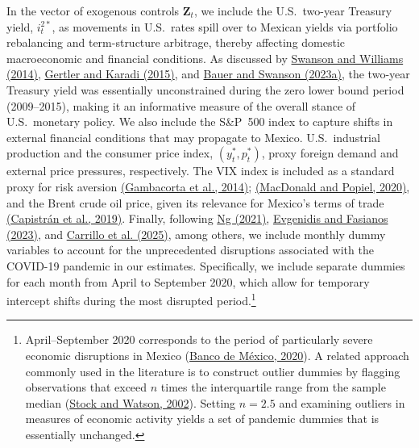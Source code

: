 \documentclass[\latexroot/\projectname]{subfiles}
\begin{document}
In the vector of exogenous controls $\boldsymbol{Z}_t$, we include the U.S.\ two-year Treasury yield, $i_t^{2*}$, as movements in U.S.\ rates spill over to Mexican yields via portfolio rebalancing and term-structure arbitrage, thereby affecting domestic macroeconomic and financial conditions. As discussed by \hyperlink{Swanson and Williams (2014)}{Swanson and Williams (2014)}, \hyperlink{Gertler and Karadi (2015)}{Gertler and Karadi (2015)}, and \hyperlink{Bauer and Swanson (2023a)}{Bauer and Swanson (2023a)}, the two-year Treasury yield was essentially unconstrained during the zero lower bound period (2009--2015), making it an informative measure of the overall stance of U.S.\ monetary policy. We also include the S\&P~500 index to capture shifts in external financial conditions that may propagate to Mexico. U.S.\ industrial production and the consumer price index, $(y_t^*, p_t^*)$, proxy foreign demand and external price pressures, respectively. The VIX index is included as a standard proxy for risk aversion \hyperlink{Gambacorta et al. (2014)}{(Gambacorta et al., 2014)}; \hyperlink{MacDonald and Popiel (2020)}{(MacDonald and Popiel, 2020)}, and the Brent crude oil price, given its relevance for Mexico’s terms of trade \hyperlink{Capistrán et al. (2019)}{(Capistrán et al., 2019)}. Finally, following \hyperlink{Ng (2021)}{Ng (2021)}, \hyperlink{Evgenidis and Fasianos (2023)}{Evgenidis and Fasianos (2023)}, and \hyperlink{Carrillo et al. (2025)}{Carrillo et al. (2025)}, among others, we include monthly dummy variables to account for the unprecedented disruptions associated with the COVID-19 pandemic in our estimates. Specifically, we include separate dummies for each month from April to September 2020, which allow for temporary intercept shifts during the most disrupted period.\footnote{April--September 2020 corresponds to the period of particularly severe economic disruptions in Mexico (\hyperlink{Banco de Mexico (2020)}{Banco de México, 2020}). A related approach commonly used in the literature is to construct outlier dummies by flagging observations that exceed $n$ times the interquartile range from the sample median (\hyperlink{Stock and Watson (2002)}{Stock and Watson, 2002}). Setting $n=2.5$ and examining outliers in measures of economic activity yields a set of pandemic dummies that is essentially unchanged.} 
\end{document}
